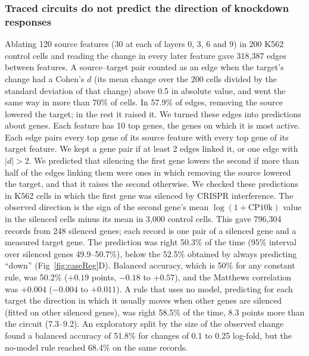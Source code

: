 \subsubsection*{Traced circuits do not predict the direction of knockdown responses}
Ablating 120 source features (30 at each of layers 0, 3, 6 and 9) in 200
K562 control cells and reading the change in every later feature gave
318,387 edges between features. A source--target pair counted as an
edge when the target's change had a Cohen's $d$ (its mean change over the
200 cells divided by the standard deviation of that change) above 0.5 in
absolute value, and went the same way in more than 70\% of cells. In
57.9\% of edges, removing the source lowered the target; in the rest it
raised it. We turned these edges into predictions about genes. Each
feature has 10 top genes, the genes on which it is most active. Each edge
pairs every top gene of its source feature with every top gene of its
target feature. We kept a gene pair if at least 2 edges linked it, or one
edge with $|d| > 2$. We predicted that silencing the first gene lowers the
second if more than half of the edges linking them were ones in which
removing the source lowered the target, and that it raises the second
otherwise. We checked these predictions in K562 cells in which the first
gene was silenced by CRISPR interference. The observed direction is the
sign of the second gene's mean $\log(1+\text{CP10k})$ value in the
silenced cells minus its mean in 3,000 control cells. This gave 796,304
records from 248 silenced genes; each record is one pair of a silenced
gene and a measured target gene. The prediction was right
50.3\% of the time (95\% interval over silenced genes 49.9--50.7\%),
below the 52.5\% obtained by always predicting ``down''
(Fig~\ref{fig:caseReg}D). Balanced accuracy, which is 50\% for any
constant rule, was 50.2\% ($+0.19$ points, $-0.18$ to $+0.57$), and the
Matthews correlation was $+0.004$ ($-0.004$ to $+0.011$). A rule that
uses no model, predicting for each target the direction in which it
usually moves when other genes are silenced (fitted on other silenced
genes), was right 58.5\% of the time, 8.3 points more than the circuit
(7.3--9.2). An exploratory split by the size of the observed change found
a balanced accuracy of 51.8\% for changes of 0.1 to 0.25 log-fold, but the
no-model rule reached 68.4\% on the same records.

